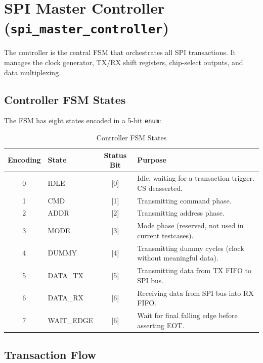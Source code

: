 \section{SPI Master Controller (\texttt{spi\_master\_controller})}

The controller is the central FSM that orchestrates all SPI transactions. It manages the clock
generator, TX/RX shift registers, chip-select outputs, and data multiplexing.

\subsection{Controller FSM States}

The FSM has eight states encoded in a 5-bit \texttt{enum}:

\begin{table}[H]
\centering
\caption{Controller FSM States}
\label{tab:fsm_states}
\small
\begin{tabularx}{\textwidth}{@{}clcX@{}}
\toprule
\textbf{Encoding} & \textbf{State} & \textbf{Status Bit} & \textbf{Purpose} \\
\midrule
0 & IDLE       & [0] & Idle, waiting for a transaction trigger. CS deasserted. \\
1 & CMD        & [1] & Transmitting command phase. \\
2 & ADDR       & [2] & Transmitting address phase. \\
3 & MODE       & [3] & Mode phase (reserved, not used in current testcases). \\
4 & DUMMY      & [4] & Transmitting dummy cycles (clock without meaningful data). \\
5 & DATA\_TX   & [5] & Transmitting data from TX FIFO to SPI bus. \\
6 & DATA\_RX   & [6] & Receiving data from SPI bus into RX FIFO. \\
7 & WAIT\_EDGE & [6] & Wait for final falling edge before asserting EOT. \\
\bottomrule
\end{tabularx}
\end{table}

\subsection{Transaction Flow}

